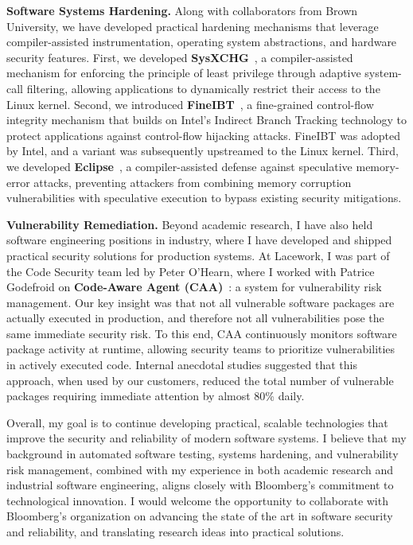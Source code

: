 \documentclass[letterpaper,single,8pt]{article}
\begin{document}
\textbf{Software Systems Hardening.} Along with collaborators from Brown University, we have developed practical hardening mechanisms that leverage compiler-assisted instrumentation, operating system abstractions, and hardware security features. First, we developed \textbf{SysXCHG}~\cite{sysxchg}, a compiler-assisted mechanism for enforcing the principle of least privilege through adaptive system-call filtering, allowing applications to dynamically restrict their access to the Linux kernel. Second, we introduced \textbf{FineIBT}~\cite{fineibt}, a fine-grained control-flow integrity mechanism that builds on Intel's Indirect Branch Tracking technology to protect applications against control-flow hijacking attacks. FineIBT was adopted by Intel, and a variant was subsequently upstreamed to the Linux kernel. Third, we developed \textbf{Eclipse}~\cite{eclipse}, a compiler-assisted defense against speculative memory-error attacks, preventing attackers from combining memory corruption vulnerabilities with speculative execution to bypass existing security mitigations.

\textbf{Vulnerability Remediation.} Beyond academic research, I have also held software engineering positions in industry, where I have developed and shipped practical security solutions for production systems. At Lacework, I was part of the Code Security team led by Peter O'Hearn, where I worked with Patrice Godefroid on \textbf{Code-Aware Agent (CAA)}~\cite{caa}: a system for vulnerability risk management. Our key insight was that not all vulnerable software packages are actually executed in production, and therefore not all vulnerabilities pose the same immediate security risk. To this end, CAA continuously monitors software package activity at runtime, allowing security teams to prioritize vulnerabilities in actively executed code. Internal anecdotal studies suggested that this approach, when used by our customers, reduced the total number of vulnerable packages requiring immediate attention by almost 80\% daily.

\enlargethispage{2\baselineskip}
Overall, my goal is to continue developing practical, scalable technologies that improve the security and reliability of modern software systems. I believe that my background in automated software testing, systems hardening, and vulnerability risk management, combined with my experience in both academic research and industrial software engineering, aligns closely with Bloomberg's commitment to technological innovation. I would welcome the opportunity to collaborate with Bloomberg's organization on advancing the state of the art in software security and reliability, and translating research ideas into practical solutions.

\pagebreak


\end{document}
